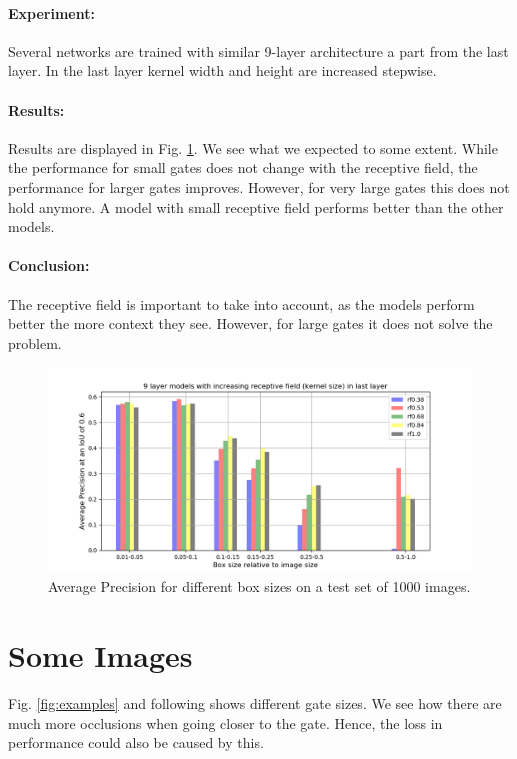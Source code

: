\documentclass{article}
\begin{document}
\paragraph{Experiment:} Several networks are trained with similar 9-layer architecture a part from the last layer. In the last layer kernel width and height are increased stepwise.

\paragraph{Results:} Results are displayed in Fig. \ref{fig:box_size}. We see what we expected to some extent. While the performance for small gates does not change with the receptive field, the performance for larger gates improves. However, for very large gates this does not hold anymore. A model with small receptive field performs better than the other models.

\paragraph{Conclusion:} The receptive field is important to take into account, as the models perform better the more context they see. However, for large gates it does not solve the problem. 

\begin{figure}[htbp]
	\includegraphics[width=\linewidth]{box_size_rf_06}
	\caption{Average Precision for different box sizes on a test set of 1000 images.}
	\label{fig:box_size}
\end{figure}

\section{Some Images}

Fig. \ref{fig:examples} and following shows different gate sizes. We see how there are much more occlusions when going closer to the gate. Hence, the loss in performance could also be caused by this.
\end{document}
